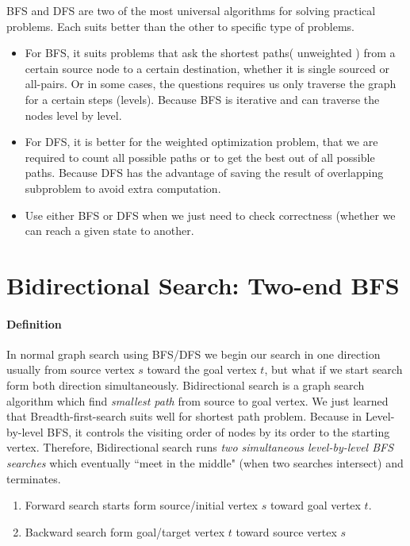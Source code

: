 BFS and DFS are two of the most universal algorithms for solving practical problems. Each suits better than the other to specific type of problems. 
 \begin{itemize}
     \item For BFS, it suits problems that ask the shortest paths( unweighted ) from a certain source node to a certain destination, whether it is single sourced or all-pairs. Or in some cases, the questions requires us only traverse the graph for a certain steps (levels). Because BFS is iterative and can traverse the nodes level by level.
     \item For DFS, it is better for the weighted optimization problem, that we are required to count all possible paths or to get the best out of all possible paths. Because DFS has the advantage of saving the result of overlapping subproblem to avoid extra computation.
     \item Use either BFS or DFS when we just need to check correctness (whether we can reach a given state to another. 
 \end{itemize}
 
 \section{Bidirectional Search: Two-end BFS}
\label{sec_bidirectional_search}
\paragraph{Definition} 
In normal graph search using BFS/DFS we begin our search in one direction usually from source vertex $s$ toward the goal vertex $t$, but what if we start search form both direction simultaneously. Bidirectional search is a graph search algorithm which find \textit{smallest path} from source to goal vertex. We just learned that Breadth-first-search suits well for shortest path problem. Because in Level-by-level BFS, it controls the visiting order of nodes by its order to the starting vertex. Therefore, Bidirectional search  runs \textit{two simultaneous level-by-level BFS searches} which eventually ``meet in the middle" (when two searches intersect) and terminates. 
\begin{enumerate}
    \item Forward search starts form source/initial vertex $s$ toward goal vertex $t$.
    \item Backward search form goal/target vertex  $t$ toward source vertex $s$
\end{enumerate}

